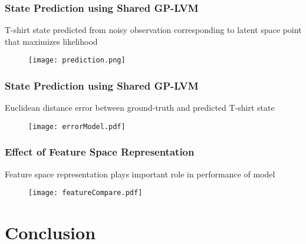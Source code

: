 \documentclass[10pt,handout]{beamer}
\begin{document}
\begin{frame}
\frametitle{State Prediction using Shared GP-LVM}

\centering 
T-shirt state predicted from noisy observation corresponding to latent space point that maximizes likelihood 
\begin{figure}
  \centering
  \texttt{[image: prediction.png]}
\end{figure}

\end{frame}

\begin{frame}
\frametitle{State Prediction using Shared GP-LVM}

\centering
Euclidean distance error between ground-truth and predicted T-shirt state

\begin{figure}
  \centering
  \texttt{[image: errorModel.pdf]}
\end{figure}

\end{frame}

\begin{frame}
\frametitle{Effect of Feature Space Representation}

\centering
Feature space representation plays important role in performance of model

\begin{figure}
  \centering
  \texttt{[image: featureCompare.pdf]}
\end{figure}

\end{frame}


\section{Conclusion}
\end{document}
